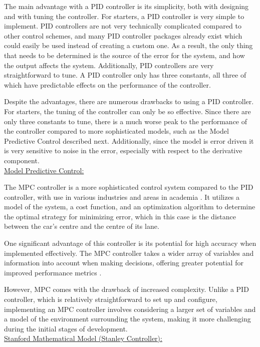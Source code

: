 \documentclass[titlepage,draft]{article}
\begin{document}
{The main advantage with a PID controller is its simplicity, both with designing and with tuning the controller. For starters, a PID controller is very simple to implement. PID controllers are not very technically complicated compared to other control schemes, and many PID controller packages already exist which could easily be used instead of creating a custom one. As a result, the only thing that needs to be determined is the source of the error for the system, and how the output affects the system. Additionally, PID controllers are very straightforward to tune. A PID controller only has three constants, all three of which have predictable effects on the performance of the controller.

Despite the advantages, there are numerous drawbacks to using a PID controller. For starters, the tuning of the controller can only be so effective. Since there are only three constants to tune, there is a much worse peak to the performance of the controller compared to more sophisticated models, such as the Model Predictive Control described next. Additionally, since the model is error driven it is very sensitive to noise in the error, especially with respect to the derivative component.
\\

\underline{Model Predictive Control:}

The MPC controller is a more sophisticated control system compared to the PID controller, with use in various industries and areas in academia \cite{GARCIA1989335}. It utilizes a model of the system, a cost function, and an optimization algorithm to determine the optimal strategy for minimizing error, which in this case is the distance between the car's centre and the centre of its lane.

One significant advantage of this controller is its potential for high accuracy when implemented effectively. The MPC controller takes a wider array of variables and information into account when making decisions, offering greater potential for improved performance metrics \cite{GARCIA1989335}.

However, MPC comes with the drawback of increased complexity. Unlike a PID controller, which is relatively straightforward to set up and configure, implementing an MPC controller involves considering a larger set of variables and a model of the environment surrounding the system, making it more challenging during the initial stages of development.
\\

\underline{Stanford Mathematical Model (Stanley Controller):}

}
\end{document}
